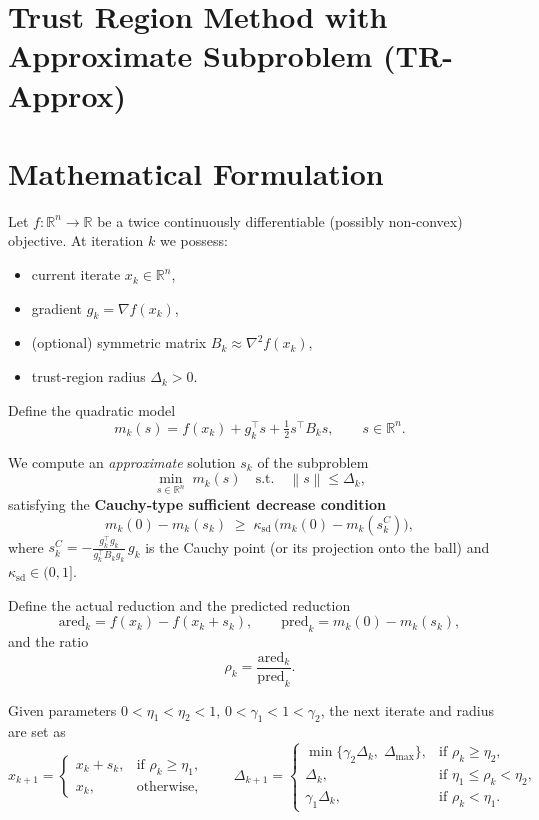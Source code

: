 \documentclass{article}
\newcommand{\RR}{\mathbb{R}}
\newcommand{\norm}[1]{\left\lVert#1\right\rVert}
\begin{document}
\section*{Trust Region Method with Approximate Subproblem (TR-Approx)}

\section*{Mathematical Formulation}
Let $f:\RR^{n}\to\RR$ be a twice continuously differentiable (possibly non‑convex) objective.  
At iteration $k$ we possess:
\begin{itemize}
    \item current iterate $x_{k}\in\RR^{n}$,
    \item gradient $g_{k}= \nabla f(x_{k})$,
    \item (optional) symmetric matrix $B_{k}\approx \nabla^{2}f(x_{k})$,
    \item trust‑region radius $\Delta_{k}>0$.
\end{itemize}
Define the quadratic model
\[
m_{k}(s)=f(x_{k})+g_{k}^{\top}s+\tfrac12 s^{\top}B_{k}s,\qquad s\in\RR^{n}.
\]

We compute an \emph{approximate} solution $s_{k}$ of the subproblem
\begin{equation}
\label{eq:subprob}
\min_{s\in\RR^{n}}\; m_{k}(s)\quad\text{s.t.}\quad \norm{s}\le \Delta_{k},
\end{equation}
satisfying the \textbf{Cauchy‑type sufficient decrease condition}
\begin{equation}
\label{eq:suffdec}
m_{k}(0)-m_{k}(s_{k})\;\ge\;\kappa_{\mathrm{sd}}\,
\bigl(m_{k}(0)-m_{k}(s_{k}^{C})\bigr),
\end{equation}
where $s_{k}^{C}= -\frac{g_{k}^{\top}g_{k}}{g_{k}^{\top}B_{k}g_{k}}\,g_{k}$ is the Cauchy point (or its projection onto the ball) and $\kappa_{\mathrm{sd}}\in(0,1]$.

Define the actual reduction and the predicted reduction
\[
\text{ared}_{k}= f(x_{k})-f(x_{k}+s_{k}),\qquad
\text{pred}_{k}= m_{k}(0)-m_{k}(s_{k}),
\]
and the ratio
\begin{equation}
\label{eq:rho}
\rho_{k}= \frac{\text{ared}_{k}}{\text{pred}_{k}}.
\end{equation}

Given parameters $0<\eta_{1}<\eta_{2}<1$, $0<\gamma_{1}<1<\gamma_{2}$, the next iterate and radius are set as
\[
x_{k+1}= \begin{cases}
x_{k}+s_{k}, & \text{if }\rho_{k}\ge\eta_{1},\\[4pt]
x_{k}, & \text{otherwise},
\end{cases}
\qquad
\Delta_{k+1}= \begin{cases}
\min\{\gamma_{2}\Delta_{k},\;\Delta_{\max}\}, & \text{if }\rho_{k}\ge\eta_{2},\\[4pt]
\Delta_{k}, & \text{if }\eta_{1}\le\rho_{k}<\eta_{2},\\[4pt]
\gamma_{1}\Delta_{k}, & \text{if }\rho_{k}<\eta_{1}.
\end{cases}
\]
\end{document}
